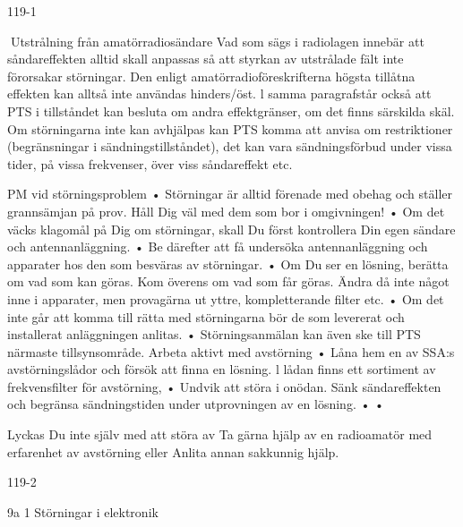 \documentclass[a4paper,twoside,twocolumn,openright]{book}
\begin{document}
{{{{{119-1

Utstrålning från amatörradiosändare
Vad som sägs i radiolagen innebär att
såndareffekten alltid skall anpassas så att
styrkan av utstrålade fält inte förorsakar störningar. Den enligt amatörradioföreskrifterna
högsta tillåtna effekten kan alltså inte användas hinders/öst. l samma paragrafstår också
att PTS i tillståndet kan besluta om andra
effektgränser, om det finns särskilda skäl.
Om störningarna inte kan avhjälpas kan
PTS komma att anvisa om restriktioner (begränsningar i sändningstillståndet), det kan
vara sändningsförbud under vissa tider, på
vissa frekvenser, över viss såndareffekt etc.

PM vid störningsproblem
• Störningar är alltid förenade med obehag
och ställer grannsämjan på prov. Håll Dig
väl med dem som bor i omgivningen!
• Om det väcks klagomål på Dig om störningar, skall Du först kontrollera Din egen
sändare och antennanläggning.
• Be därefter att få undersöka antennanläggning och apparater hos den som besväras av störningar.
• Om Du ser en lösning, berätta om vad
som kan göras. Kom överens om vad
som får göras. Ändra då inte något inne i
apparater, men provagärna ut yttre, kompletterande filter etc.
• Om det inte går att komma till rätta med
störningarna bör de som levererat och
installerat anläggningen anlitas.
• Störningsanmälan kan även ske till PTS
närmaste tillsynsområde.
Arbeta aktivt med avstörning
• Låna hem en av SSA:s avstörningslådor
och försök att finna en lösning. l lådan
finns ett sortiment av frekvensfilter för
avstörning,
• Undvik att störa i onödan. Sänk sändareffekten och begränsa sändningstiden
under utprovningen av en lösning.
•
•

Lyckas Du inte själv med att störa av
Ta gärna hjälp av en radioamatör med
erfarenhet av avstörning eller
Anlita annan sakkunnig hjälp.

119-2

9a 1 Störningar i elektronik

}}}}}
\end{document}
